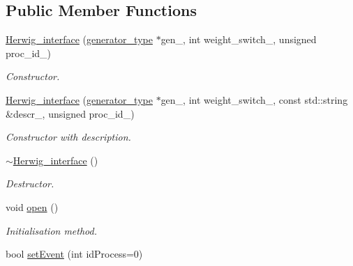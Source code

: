 \subsection*{Public Member Functions}
\begin{DoxyCompactItemize}
\item 
\hypertarget{a00283_ac7783bf83f16bd4a075a6e3cfd438edc}{}\hyperlink{a00283_ac7783bf83f16bd4a075a6e3cfd438edc}{Herwig\+\_\+interface} (\hyperlink{a00451}{generator\+\_\+type} $\ast$gen\+\_\+, int weight\+\_\+switch\+\_\+, unsigned proc\+\_\+id\+\_)\label{a00283_ac7783bf83f16bd4a075a6e3cfd438edc}

\begin{DoxyCompactList}\small\item\em Constructor. \end{DoxyCompactList}\item 
\hypertarget{a00283_a497fa7494387d4a28095ee407b8a458d}{}\hyperlink{a00283_a497fa7494387d4a28095ee407b8a458d}{Herwig\+\_\+interface} (\hyperlink{a00451}{generator\+\_\+type} $\ast$gen\+\_\+, int weight\+\_\+switch\+\_\+, const std\+::string \&descr\+\_\+, unsigned proc\+\_\+id\+\_)\label{a00283_a497fa7494387d4a28095ee407b8a458d}

\begin{DoxyCompactList}\small\item\em Constructor with description. \end{DoxyCompactList}\item 
\hypertarget{a00283_a100c57c8c8a36b0ddc6a05378c2977c2}{}\hyperlink{a00283_a100c57c8c8a36b0ddc6a05378c2977c2}{$\sim$\+Herwig\+\_\+interface} ()\label{a00283_a100c57c8c8a36b0ddc6a05378c2977c2}

\begin{DoxyCompactList}\small\item\em Destructor. \end{DoxyCompactList}\item 
\hypertarget{a00283_a7813e6b9a95a413999dcb25e9b447637}{}void \hyperlink{a00283_a7813e6b9a95a413999dcb25e9b447637}{open} ()\label{a00283_a7813e6b9a95a413999dcb25e9b447637}

\begin{DoxyCompactList}\small\item\em Initialisation method. \end{DoxyCompactList}\item 
\hypertarget{a00283_aadb707b92b34464fd1ff595e85d2d11a}{}bool \hyperlink{a00283_aadb707b92b34464fd1ff595e85d2d11a}{set\+Event} (int id\+Process=0)\label{a00283_aadb707b92b34464fd1ff595e85d2d11a}


\end{DoxyCompactItemize}

